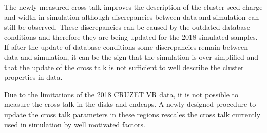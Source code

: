 The newly measured cross talk improves the description of the cluster seed charge and width in  simulation although discrepancies between data and simulation can still be observed. These discrepancies can be caused by the outdated database conditions and therefore they are being updated for the 2018 simulated samples. If after the update of database conditions some discrepancies remain between data and simulation, it can be the sign that the simulation is over-simplified and that the update of the cross talk is not sufficient to well describe the cluster properties in data.



Due to the limitations of the 2018 CRUZET VR data, it is not possible to measure the cross talk in the disks and endcaps. A newly designed procedure to update the cross talk parameters in these regions rescales the cross talk currently used in simulation  by well motivated factors. 



